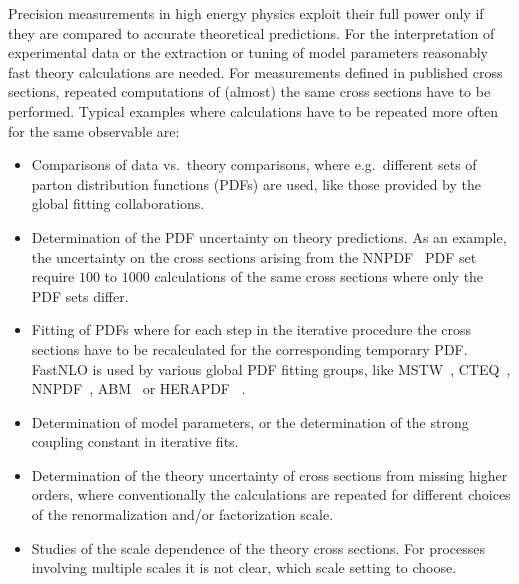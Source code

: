 \documentclass{DISproc}
\begin{document}
Precision measurements in high energy physics exploit their full power
only if they are compared to accurate theoretical predictions.  For
the interpretation of experimental data or the extraction or tuning of
model parameters reasonably fast theory calculations are needed.  For
measurements defined in published cross sections, repeated
computations of (almost) the same cross sections have to be performed.
Typical examples where calculations have to be repeated more often for
the same observable are:
\begin{itemize}
\item Comparisons of data vs.\ theory comparisons, where e.g.\
  different sets of parton distribution functions (PDFs) are used,
  like those provided by the global fitting collaborations.
\item Determination of the PDF uncertainty on theory predictions.  As
  an example, the uncertainty on the cross sections arising from the
  NNPDF~\cite{Ball:2011mu} PDF set require $100$ to $1000$
  calculations of the same cross sections where only the PDF sets
  differ.
\item Fitting of PDFs where for each step in the iterative procedure
  the cross sections have to be recalculated for the corresponding
  temporary PDF.  FastNLO is used by various global PDF fitting
  groups, like MSTW~\cite{Martin:2009iq}, CTEQ~\cite{Lai:2010vv},
  NNPDF~\cite{Ball:2011mu}, ABM~\cite{Alekhin:2012ig} or
  HERAPDF~\cite{Nowak:12} .
\item Determination of model parameters, or the determination of the
  strong coupling constant in iterative fits.
\item Determination of the theory uncertainty of cross sections from
  missing higher orders, where conventionally the calculations are
  repeated for different choices of the renormalization and/or
  factorization scale.
\item Studies of the scale dependence of the theory cross sections.
  For processes involving multiple scales it is not clear, which scale
  setting to choose.

\end{itemize}
\end{document}
